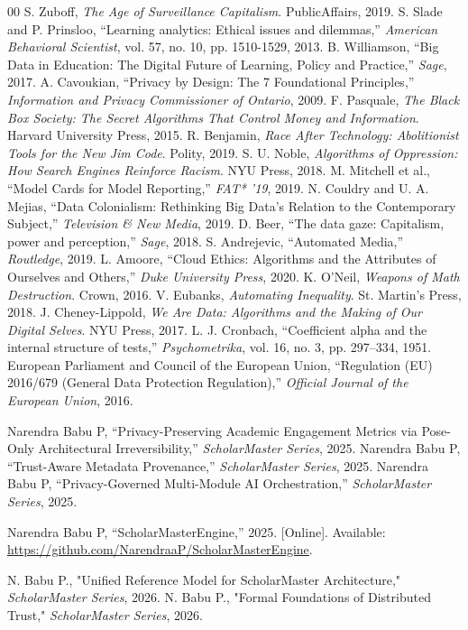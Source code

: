 \documentclass[conference]{IEEEtran}
\begin{document}
\begin{thebibliography}{00}
 S. Zuboff, \textit{The Age of Surveillance Capitalism}. PublicAffairs, 2019.
 S. Slade and P. Prinsloo, ``Learning analytics: Ethical issues and dilemmas,'' \textit{American Behavioral Scientist}, vol. 57, no. 10, pp. 1510-1529, 2013.
 B. Williamson, ``Big Data in Education: The Digital Future of Learning, Policy and Practice,'' \textit{Sage}, 2017.
 A. Cavoukian, ``Privacy by Design: The 7 Foundational Principles,'' \textit{Information and Privacy Commissioner of Ontario}, 2009.
 F. Pasquale, \textit{The Black Box Society: The Secret Algorithms That Control Money and Information}. Harvard University Press, 2015.
 R. Benjamin, \textit{Race After Technology: Abolitionist Tools for the New Jim Code}. Polity, 2019.
 S. U. Noble, \textit{Algorithms of Oppression: How Search Engines Reinforce Racism}. NYU Press, 2018.
 M. Mitchell et al., ``Model Cards for Model Reporting,'' \textit{FAT* '19}, 2019.
 N. Couldry and U. A. Mejias, ``Data Colonialism: Rethinking Big Data's Relation to the Contemporary Subject,'' \textit{Television \& New Media}, 2019.
 D. Beer, ``The data gaze: Capitalism, power and perception,'' \textit{Sage}, 2018.
 S. Andrejevic, ``Automated Media,'' \textit{Routledge}, 2019.
 L. Amoore, ``Cloud Ethics: Algorithms and the Attributes of Ourselves and Others,'' \textit{Duke University Press}, 2020.
 K. O'Neil, \textit{Weapons of Math Destruction}. Crown, 2016.
 V. Eubanks, \textit{Automating Inequality}. St. Martin's Press, 2018.
 J. Cheney-Lippold, \textit{We Are Data: Algorithms and the Making of Our Digital Selves}. NYU Press, 2017.
 L. J. Cronbach, ``Coefficient alpha and the internal structure of tests,'' \textit{Psychometrika}, vol. 16, no. 3, pp. 297--334, 1951.
 European Parliament and Council of the European Union, ``Regulation (EU) 2016/679 (General Data Protection Regulation),'' \textit{Official Journal of the European Union}, 2016.

 Narendra Babu P, ``Privacy-Preserving Academic Engagement Metrics via Pose-Only Architectural Irreversibility,'' \textit{ScholarMaster Series}, 2025.
 Narendra Babu P, ``Trust-Aware Metadata Provenance,'' \textit{ScholarMaster Series}, 2025.
 Narendra Babu P, ``Privacy-Governed Multi-Module AI Orchestration,'' \textit{ScholarMaster Series}, 2025.

 Narendra Babu P, ``ScholarMasterEngine,'' 2025. [Online]. Available: \url{https://github.com/NarendraaP/ScholarMasterEngine}.


 N. Babu P., "Unified Reference Model for ScholarMaster Architecture," \textit{ScholarMaster Series}, 2026.
 N. Babu P., "Formal Foundations of Distributed Trust," \textit{ScholarMaster Series}, 2026.
\end{thebibliography}
\end{document}
